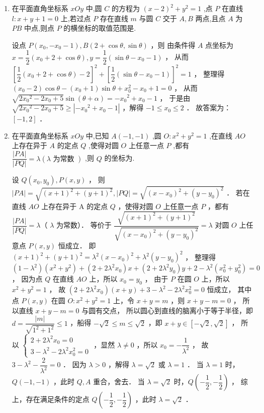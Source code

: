 \begin{enumerate}
    \item 在平面直角坐标系 ${xOy}$ 中,圆 $C$ 的方程为 ${\left( x - 2\right) }^{2} + {y}^{2} = 1$ ,点 $P$ 在直线 $l : x + y + 1 = 0$ 上,若过点 $P$ 存在直线 $m$ 与圆 $C$ 交于 ${A},{B}$ 两点,且点 ${A}$ 为 ${PB}$ 中点,则点 $P$ 的横坐标的取值范围是\blkda[3]{$[-1,2]$}.
    \begin{jieda}
        设点 $P\left(x_0,-x_0-1\right), B(2+\cos \theta, \sin \theta)$ ，则
由条件得 $A$ 点坐标为 $x=\dfrac{1}{2}\left(x_0+2+\cos \theta\right), y=\dfrac{1}{2}\left(\sin \theta-x_0-1\right)$ ，
从而 $\left[\dfrac{1}{2}\left(x_0+2+\cos \theta\right)-2\right]^2+\left[\dfrac{1}{2}\left(\sin \theta-x_0-1\right)\right]^2=1$ ，
整理得 $\left(x_0-2\right) \cos \theta-\left(x_0+1\right) \sin \theta+x_0^2-x_0+1=0$ ，
从而 $\sqrt{2 {x}_0{ }^2-2 {x}_0+5} \sin (\theta+\alpha)=-x_0{ }^2+x_0-1$ ，
于是由 $\sqrt{2 {x}_0{ }^2-2 {x}_0+5} \geqslant\left|-x_0{ }^2+x_0-1\right|$ ，解得 $-1 \leqslant x_0 \leqslant 2$ ．
故答案为：$[-1,2]$ ．
    \end{jieda}
    
    \item 在平面直角坐标系 ${xOy}$ 中,已知 $A\left( {-1, - 1}\right)$ ,圆 $O : {x}^{2} + {y}^{2} = 1$ ,在直线 ${AO}$ 上存在异于 ${A}$ 的定点 $Q$ ,使得对圆 $O$ 上任意一点 $P$ ,都有 $\dfrac{\left| PA\right| }{\left| PQ\right| } = \lambda \left( {\lambda \text{ 为常数 }}\right)$ ,则 $Q$ 的坐标为.
    \begin{jieda}
    设 $Q\left(x_0, y_0\right), P(x, y)$ ，
则 $|P A|=\sqrt{(x+1)^2+(y+1)^2},|P Q|=\sqrt{\left(x-x_0\right)^2+\left(y-y_0\right)^2}$ ．
若在直线 $A O$ 上存在异于 A 的定点 $Q$ ，使得对圆 $O$ 上任意一点 $P$ ，都有 $\dfrac{|P A|}{|P Q|}=\lambda$（ $\lambda$ 为常数）．
等价于 $\dfrac{\sqrt{(x+1)^2+(y+1)^2}}{\sqrt{\left(x-x_0\right)^2+\left(y-y_0\right)^2}}=\lambda$ 对圆 $O$ 上任意点 $P(x, y)$ 恒成立．
即 $(x+1)^2+(y+1)^2=\lambda^2\left(x-x_0\right)^2+\lambda^2\left(y-y_0\right)^2$ ，
整理得 $\left(1-\lambda^2\right)\left(x^2+y^2\right)+\left(2+2 \lambda^2 x_0\right) x+\left(2+2 \lambda^2 y_0\right) y+2-\lambda^2\left(x_0^2+y_0^2\right)=0$ ，
因为点 $Q$ 在直线 $A O$ 上，所以 $x_0=y_0$ ，
由于 $P$ 在圆 $O$ 上，所以 $x^2+y^2=1$ ，
故 $\left(2+2 \lambda^2 x_0\right)(x+y)+3-\lambda^2-2 \lambda^2 x_0^2=0$ 恒成立，
其中点 $P(x, y)$ 在圆 $O: x^2+y^2=1$ 上，令 $x+y=m$ ，则 $x+y-m=0$ ，
所以直线 $x+y-m=0$ 与圆有交点，
所以圆心到直线的脑离小于等于半径，即 $d=\dfrac{|m|}{\sqrt{1^2+1^2}} \leq 1$ ，船得 $-\sqrt{2} \leq m \leq \sqrt{2}$ ，即 $x+y \in[-\sqrt{2}, \sqrt{2}]$ ，
所以 $\left\{\begin{array}{l}2+2 \lambda^2 x_0=0 \\ 3-\lambda^2-2 \lambda^2 x_0^2=0\end{array}\right.$ ，显然 $\lambda \neq 0$ ，所以 $x_0=-\dfrac{1}{\lambda^2}$ ，
故 $3-\lambda^2-\dfrac{2}{\lambda^2}=0$ ．
因为 $\lambda>0$ ，解得 $\lambda=\sqrt{2}$ 或 $\lambda=1$ ．
当 $\lambda=1$ 时，$Q(-1,-1)$ ，此时 $Q, A$ 重合，舍去．
当 $\lambda=\sqrt{2}$ 时，$Q\left(-\dfrac{1}{2},-\dfrac{1}{2}\right)$ ，
综上，存在满足条件的定点 $Q\left(-\dfrac{1}{2},-\dfrac{1}{2}\right)$ ，此时 $\lambda=\sqrt{2}$ ．
    \end{jieda}


\end{enumerate}
